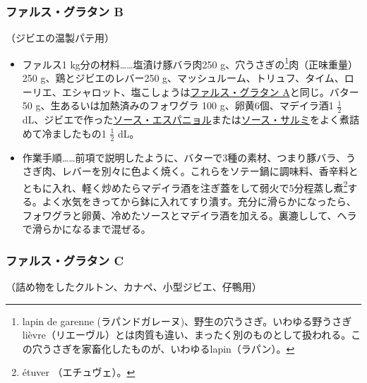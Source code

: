 \begin{recette}
\atoaki{}

\hypertarget{farce-gratin-b}{%
\subsubsection{ファルス・グラタン B}\label{farce-gratin-b}}


（ジビエの温製パテ用）


\begin{itemize}
\item
  ファルス1 kg分の材料\ldots{}\ldots{}塩漬け豚バラ肉250
  g、穴うさぎの\footnote{lapin de garenne
    (ラパンドガレーヌ)、野生の穴うさぎ。いわゆる野うさぎlièvre（リエーヴル）とは肉質も違い、まったく別のものとして扱われる。この穴うさぎを家畜化したものが、いわゆるlapin（ラパン）。}肉（正味重量）250
  g、鶏とジビエのレバー250
  g、マッシュルーム、トリュフ、タイム、ローリエ、エシャロット、塩こしょうは\protect\hyperlink{farce-gratin-a}{ファルス・グラタン
  A}と同じ。バター50 g、生あるいは加熱済みのフォワグラ 100
  g、卵黄6個、マデイラ酒1 \(\frac{1}{2}\)
  dL、ジビエで作った\protect\hyperlink{sauce-espagnole}{ソース・エスパニョル}または\protect\hyperlink{sauce-salmis}{ソース・サルミ}をよく煮詰めて冷ましたもの1
  \(\frac{1}{2}\) dL。
\item
  作業手順\ldots{}\ldots{}前項で説明したように、バターで3種の素材、つまり豚バラ、うさぎ肉、レバーを別々に色よく焼く。これらをソテー鍋に調味料、香辛料とともに入れ、軽く炒めたらマデイラ酒を注ぎ蓋をして弱火で5分程蒸し煮\footnote{étuver
    （エチュヴェ）。}する。よく水気をきってから鉢に入れてすり潰す。充分に滑らかになったら、フォワグラと卵黄、冷めたソースとマデイラ酒を加える。裏漉しして、ヘラで滑らかになるまで混ぜる。
\end{itemize}

\atoaki{}

\hypertarget{farce-gratin-c}{%
\subsubsection{ファルス・グラタン C}\label{farce-gratin-c}}



（詰め物をしたクルトン、カナペ、小型ジビエ、仔鴨用）


\end{recette}
